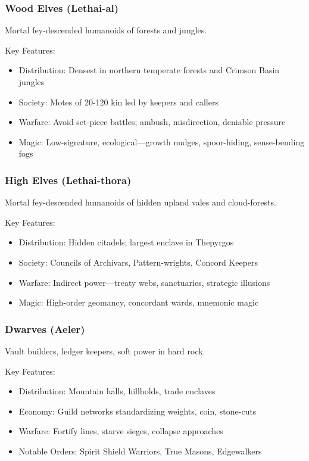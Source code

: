 \subsubsection{Wood Elves (Lethai-al)}
\label{sec:woodelves}

Mortal fey-descended humanoids of forests and jungles.

Key Features:
\begin{itemize}
    \item Distribution: Densest in northern temperate forests and Crimson Basin jungles
    \item Society: Motes of 20-120 kin led by keepers and callers
    \item Warfare: Avoid set-piece battles; ambush, misdirection, deniable pressure
    \item Magic: Low-signature, ecological—growth nudges, spoor-hiding, sense-bending fogs
\end{itemize}

\subsubsection{High Elves (Lethai-thora)}
\label{sec:highelves}

Mortal fey-descended humanoids of hidden upland vales and cloud-forests.

Key Features:
\begin{itemize}
    \item Distribution: Hidden citadels; largest enclave in Thepyrgos
    \item Society: Councils of Archivars, Pattern-wrights, Concord Keepers
    \item Warfare: Indirect power—treaty webs, sanctuaries, strategic illusions
    \item Magic: High-order geomancy, concordant wards, mnemonic magic
\end{itemize}

\subsubsection{Dwarves (Aeler)}
\label{sec:dwarves}

Vault builders, ledger keepers, soft power in hard rock.

Key Features:
\begin{itemize}
    \item Distribution: Mountain halls, hillholds, trade enclaves
    \item Economy: Guild networks standardizing weights, coin, stone-cuts
    \item Warfare: Fortify lines, starve sieges, collapse approaches
    \item Notable Orders: Spirit Shield Warriors, True Masons, Edgewalkers
\end{itemize}


